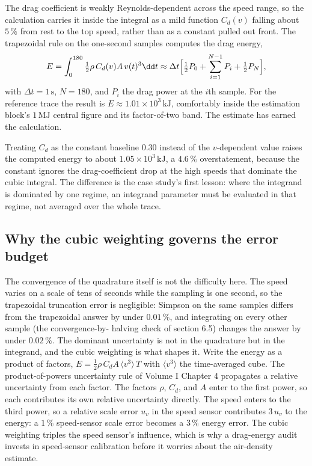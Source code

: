 

The drag coefficient is weakly Reynolds-dependent across the speed
range, so the calculation carries it inside the integral as a mild
function $C_{d}(v)$ falling about $5\,\%$ from rest to the top speed,
rather than as a constant pulled out front. The trapezoidal rule on the
one-second samples computes the drag energy,
\[
E = \int_{0}^{180}\tfrac{1}{2}\rho\,C_{d}(v)A\,v(t)^{3}\dd t \approx
\Delta t\Bigl[\tfrac{1}{2}P_{0} + \sum_{i=1}^{N-1}P_{i} +
\tfrac{1}{2}P_{N}\Bigr],
\]
with $\Delta t = 1\,\si{\second}$, $N = 180$, and $P_{i}$ the drag
power at the $i$th sample. For the reference trace the result is $E
\approx 1.01\times 10^{3}\,\si{\kilo\joule}$, comfortably inside the
estimation block's $1\,\si{\mega\joule}$ central figure and its
factor-of-two band. The estimate has earned the calculation.

Treating $C_{d}$ as the constant baseline $0.30$ instead of the
$v$-dependent value raises the computed energy to about $1.05\times
10^{3}\,\si{\kilo\joule}$, a $4.6\,\%$ overstatement, because the
constant ignores the drag-coefficient drop at the high speeds that
dominate the cubic integral. The difference is the case study's first
lesson: where the integrand is dominated by one regime, an integrand
parameter must be evaluated in that regime, not averaged over the whole
trace.

\subsection{Why the cubic weighting governs the error budget}

The convergence of the quadrature itself is not the difficulty here.
The speed varies on a scale of tens of seconds while the sampling is
one second, so the trapezoidal truncation error is negligible: Simpson
on the same samples differs from the trapezoidal answer by under
$0.01\,\%$, and integrating on every other sample (the convergence-by-
halving check of section 6.5) changes the answer by under $0.02\,\%$.
The dominant uncertainty is not in the quadrature but in the integrand,
and the cubic weighting is what shapes it. Write the energy as a
product of factors, $E = \tfrac{1}{2}\rho\,C_{d}A\,\langle
v^{3}\rangle\,T$ with $\langle v^{3}\rangle$ the time-averaged cube.
The product-of-powers uncertainty rule of Volume I Chapter 4 propagates
a relative uncertainty from each factor. The factors $\rho$, $C_{d}$,
and $A$ enter to the first power, so each contributes its own relative
uncertainty directly. The speed enters to the third power, so a
relative scale error $u_{v}$ in the speed sensor contributes
$3\,u_{v}$ to the energy: a $1\,\%$ speed-sensor scale error becomes a
$3\,\%$ energy error. The cubic weighting triples the speed sensor's
influence, which is why a drag-energy audit invests in speed-sensor
calibration before it worries about the air-density estimate.

